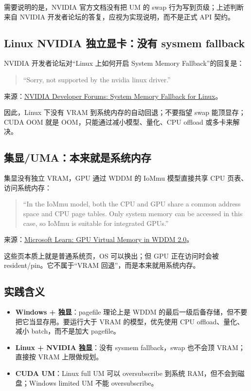 \documentclass[a4paper, 12pt, linespread=1.35]{ctexart}   %
\begin{document}
需要说明的是，NVIDIA 官方文档没有把 UM 的 swap 行为写到页级；上述判断来自 NVIDIA 开发者论坛的答复，应视为实现说明，而不是正式 API 契约。

\subsection{Linux NVIDIA 独立显卡：没有 sysmem fallback}

NVIDIA 开发者论坛对“Linux 上如何开启 System Memory Fallback”的回复是：

\begin{quote}
\small
``Sorry, not supported by the nvidia linux driver.''
\end{quote}

\noindent
来源：\href{https://forums.developer.nvidia.com/t/system-memory-fallback-for-linux/296874}{NVIDIA Developer Forums: System Memory Fallback for Linux}。

因此，Linux 下没有 VRAM 到系统内存的自动回退；不要指望 swap 能顶显存；CUDA OOM 就是 OOM，只能通过减小模型、量化、CPU offload 或多卡来解决。

\subsection{集显/UMA：本来就是系统内存}

集显没有独立 VRAM，GPU 通过 WDDM 的 IoMmu 模型直接共享 CPU 页表、访问系统内存：

\begin{quote}
\small
``In the IoMmu model, both the CPU and GPU share a common address space and CPU page tables. Only system memory can be accessed in this case, so IoMmu is suitable for integrated GPUs.''
\end{quote}

\noindent
来源：\href{https://learn.microsoft.com/en-us/windows-hardware/drivers/display/gpu-virtual-memory-in-wddm-2-0}{Microsoft Learn: GPU Virtual Memory in WDDM 2.0}。

这些页本质上就是普通系统页，OS 可以换出；但 GPU 正在访问时会被 resident/pin。它不属于“VRAM 回退”，而是本来就用系统内存。

\subsection{实践含义}

\begin{itemize}
  \item \textbf{Windows + 独显}：pagefile 理论上是 WDDM 的最后一级后备存储，但不要把它当显存用。要运行大于 VRAM 的模型，优先使用 CPU offload、量化、减小 batch，而不是加大 pagefile。
  \item \textbf{Linux + NVIDIA 独显}：没有 sysmem fallback，swap 也不会顶 VRAM；直接按 VRAM 上限做规划。
  \item \textbf{CUDA UM}：Linux full UM 可以 oversubscribe 到系统 RAM，但不会到磁盘；Windows limited UM 不能 oversubscribe。
\end{itemize}
\end{document}
